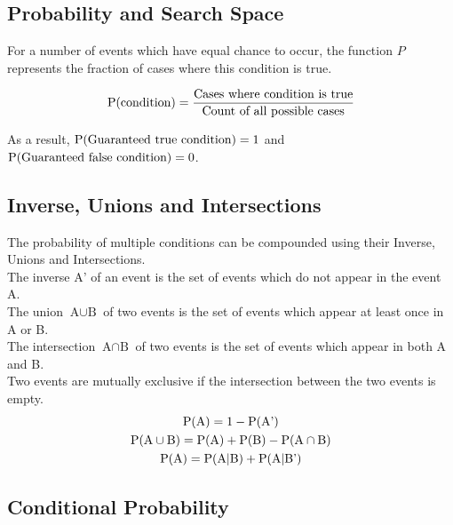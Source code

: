 \documentclass[../main]{subfiles}
\begin{document}
	\subsection{Probability and Search Space}

	For a number of events which have equal chance to occur, the function \(P\) represents the fraction of cases where this condition is true.

	\[ \operatorname{P}(\text{condition}) = \frac{\text{Cases where condition is true}}{\text{Count of all possible cases}}\]

	As a result, \(\operatorname{P}(\text{Guaranteed true condition}) = 1 \) and \(\operatorname{P}(\text{Guaranteed false condition}) = 0 \). \\

	\subsection{Inverse, Unions and Intersections}

	The probability of multiple conditions can be compounded using their Inverse, Unions and Intersections. \\

	The inverse \(\text{A'}\) of an event is the set of events which do not appear in the event A. \\

	The union \(\text{A}\cup\text{B}\) of two events is the set of events which appear at least once in A or B. \\

	The intersection \(\text{A}\cap\text{B}\) of two events is the set of events which appear in both A and B. \\

	Two events are mutually exclusive if the intersection between the two events is empty. \\

	\begin{equation*} \begin{gathered}
		\operatorname{P}(\text{A}) = 1 - \operatorname{P}(\text{A'}) \\
		\operatorname{P}(\text{A}\cup\text{B}) = \operatorname{P}(\text{A}) + \operatorname{P}(\text{B}) - \operatorname{P}(\text{A}\cap\text{B}) \\
		\operatorname{P}(\text{A}) = \operatorname{P}(\text{A}|\text{B}) + \operatorname{P}(\text{A}|\text{B'}) \\
	\end{gathered} \end{equation*}

	\subsection{Conditional Probability}
\end{document}
